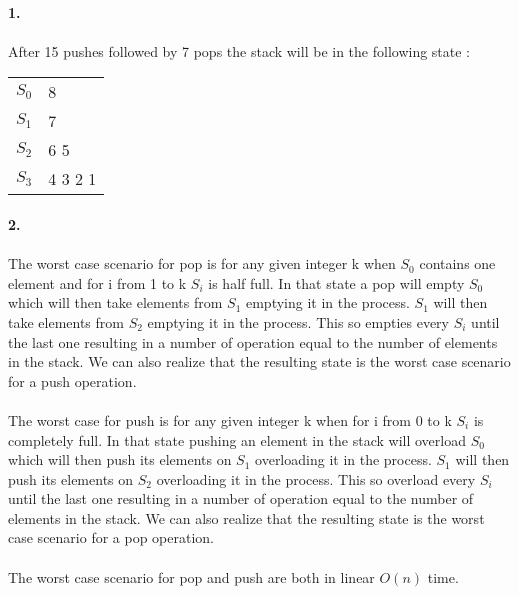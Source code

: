 

\paragraph{1.} 
\paragraph{}
After 15 pushes followed by 7 pops the stack will be in the following state :

\begin{tabular}{rl}
$S_0$ & 8 \\
$S_1$ & 7 \\
$S_2$ & 6 5 \\
$S_3$ & 4 3 2 1 \\
\end{tabular}


\paragraph{2.} 
\paragraph{}
The worst case scenario for pop is for any given integer k when $S_0$ contains one element and for i from 1 to k $S_i$ is half full. In that state a pop will empty $S_0$ which will then take elements from $S_1$ emptying it in the process. $S_1$ will then take elements from $S_2$ emptying it in the process. This so empties every $S_i$ until the last one resulting in a number of operation equal to the number of elements in the stack. We can also realize that the resulting state is the worst case scenario for a push operation.
\paragraph{}
The worst case for push is for any given integer k when for i from 0 to k $S_i$ is completely full. In that state pushing an element in the stack will overload $S_0$ which will then push its elements on $S_1$ overloading it in the process. $S_1$ will then push its elements on $S_2$ overloading it in the process. This so overload every $S_i$ until the last one resulting in a number of operation equal to the number of elements in the stack. We can also realize that the resulting state is the worst case scenario for a pop operation.
\paragraph{}
The worst case scenario for pop and push are both in linear $O(n)$ time.


